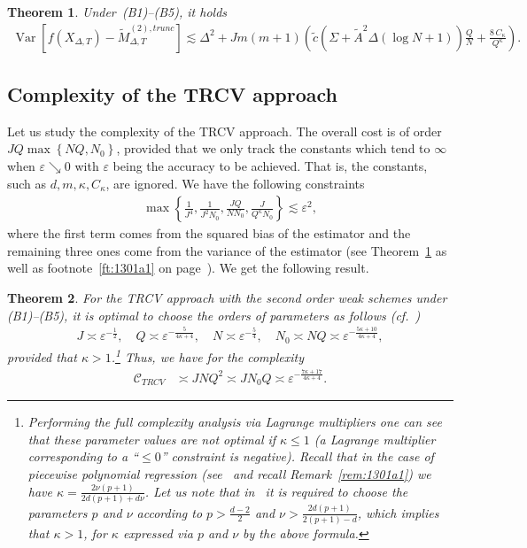 \documentclass[11pt,a4paper]{amsart}
\theoremstyle{plain}
\newtheorem{theorem}{Theorem}[section]
\theoremstyle{definition}
\theoremstyle{remark}
\numberwithin{equation}{section}
\newcommand*{\Var}{\operatorname{Var}}
\begin{document}
\begin{theorem}
\label{th:2106a1}
Under~(B1)--(B5), it holds
\begin{align*}
\Var[f(X_{\Delta,T})-
\widetilde{M}^{(2),trunc}_{\Delta,T}]
\lesssim \Delta^2+ Jm(m+1)\left(\tilde{c}(\Sigma+\tilde A^2\Delta(\log N+1))\frac{Q}{N}
+\frac{8\,C_\kappa}{Q^\kappa}\right).
\end{align*}
\end{theorem}






\subsection{Complexity of the TRCV approach}
\label{sec:trcv}
Let us study the complexity of the TRCV approach. The overall cost is of order $JQ\max\left\{NQ,N_0\right\}$, provided that we only track the constants which tend to $\infty$ when $\varepsilon\searrow 0$ with $\varepsilon$ being the accuracy to be achieved. That is, the constants, such as $d,m,\kappa,C_\kappa$, are ignored.
We have the following constraints
\begin{align}
\label{trcv_constr}
\max\left\{\frac{1}{J^4},\frac{1}{J^2 N_0},
\frac{JQ}{NN_0},
\frac{J}{Q^\kappa N_0}\right\}\lesssim\varepsilon^2,
\end{align}
where the first term comes from the squared bias of the estimator and the remaining three ones come from the variance of the estimator
(see Theorem~\ref{th:2106a1}
as well as footnote~\ref{ft:1301a1}
on page~\pageref{ft:1301a1}).
We get the following result.

\begin{theorem}
\label{trcv_compl}
For the TRCV approach with the second order weak schemes
under (B1)--(B5),
it is optimal to choose the orders of parameters as follows
(cf.~\cite{belomestny2016stratified})
\begin{gather*}
J\asymp\varepsilon^{-\frac{1}{2}},\quad Q\asymp \varepsilon^{-\frac{5}{4\kappa+4}},\quad N\asymp \varepsilon^{-\frac{5}{4}},\quad 
N_0\asymp NQ\asymp \varepsilon^{-\frac{5\kappa+10}{4\kappa+4}},
\end{gather*}
provided that $\kappa>1$.\footnote{\label{fn:trcv}Performing
the full complexity analysis via Lagrange multipliers one can see that these parameter values are
\emph{not} optimal if $\kappa\le 1$
(a Lagrange multiplier corresponding to
a ``$\le0$'' constraint is negative).
Recall that in the case of piecewise polynomial regression
(see~\cite{belomestny2016variance}
and recall Remark~\ref{rem:1301a1})
we have $\kappa=\frac{2\nu(p+1)}{2d(p+1)+d\nu}$.
Let us note that
in~\cite{belomestny2016variance} it is required
to choose the parameters $p$ and $\nu$ according to
$p>\frac{d-2}2$ and $\nu>\frac{2d(p+1)}{2(p+1)-d}$,
which implies that $\kappa>1$,
for $\kappa$ expressed via $p$ and $\nu$ by the above formula.}
Thus, we have for the complexity
\begin{align}
\label{eq:complt}
\mathcal{C}_{TRCV}&\asymp JNQ^2 \asymp JN_0Q\asymp \varepsilon^{-\frac{7\kappa+17}{4\kappa+4}}. 
\end{align}
\end{theorem}
\end{document}
